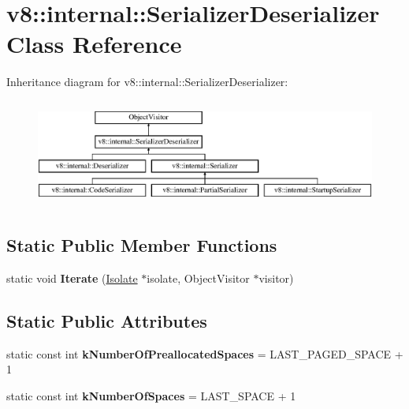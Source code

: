 \hypertarget{classv8_1_1internal_1_1_serializer_deserializer}{}\section{v8\+:\+:internal\+:\+:Serializer\+Deserializer Class Reference}
\label{classv8_1_1internal_1_1_serializer_deserializer}
Inheritance diagram for v8\+:\+:internal\+:\+:Serializer\+Deserializer\+:\begin{figure}[H]
\begin{center}
\leavevmode
\includegraphics[height=3.555556cm]{classv8_1_1internal_1_1_serializer_deserializer}
\end{center}
\end{figure}
\subsection*{Static Public Member Functions}
\begin{DoxyCompactItemize}
\item 
static void {\bfseries Iterate} (\hyperlink{classv8_1_1internal_1_1_isolate}{Isolate} $\ast$isolate, Object\+Visitor $\ast$visitor)\hypertarget{classv8_1_1internal_1_1_serializer_deserializer_a8c284f6dc5501d03f52a1dc8a2a220d2}{}\label{classv8_1_1internal_1_1_serializer_deserializer_a8c284f6dc5501d03f52a1dc8a2a220d2}

\end{DoxyCompactItemize}
\subsection*{Static Public Attributes}
\begin{DoxyCompactItemize}
\item 
static const int {\bfseries k\+Number\+Of\+Preallocated\+Spaces} = L\+A\+S\+T\+\_\+\+P\+A\+G\+E\+D\+\_\+\+S\+P\+A\+CE + 1\hypertarget{classv8_1_1internal_1_1_serializer_deserializer_aaed98bc38a78b739bf9bfefbf958d6c2}{}\label{classv8_1_1internal_1_1_serializer_deserializer_aaed98bc38a78b739bf9bfefbf958d6c2}

\item 
static const int {\bfseries k\+Number\+Of\+Spaces} = L\+A\+S\+T\+\_\+\+S\+P\+A\+CE + 1\hypertarget{classv8_1_1internal_1_1_serializer_deserializer_a6daa032c293e99bdf9f7d66d8365f556}{}\label{classv8_1_1internal_1_1_serializer_deserializer_a6daa032c293e99bdf9f7d66d8365f556}

\end{DoxyCompactItemize}
